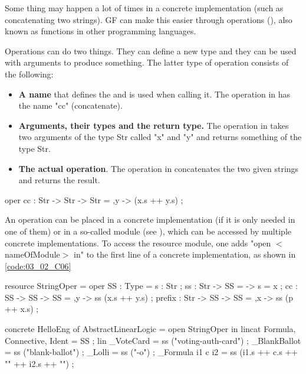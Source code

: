 Some thing may happen a lot of times in a concrete implementation (such as concatenating two strings). GF can make this easier through operations (), also known as functions in other programming languages. 

Operations can do two things. They can define a new type and they can be used with arguments to produce something. The latter type of operation consists of the following:
\begin{itemize}
\item \textbf{A name} that defines the  and is used when calling it. The operation in  has the name "cc" (concatenate).

\item \textbf{Arguments, their types and the return type.} The operation in  takes two arguments of the type Str called "x" and "y" and returns something of the type Str.

\item \textbf{The actual operation}. The operation in  concatenates the two given strings and returns the result.
\end{itemize}

\begin{lstgf}
oper 
    cc : Str -> Str -> Str = \x,y -> (x.s ++ y.s) ;
\end{lstgf}

An operation can be placed in a concrete implementation (if it is only needed in one of them) or in a so-called  module (see ), which can be accessed by multiple concrete implementations. To access the resource module, one adds "open $<$nameOfModule$>$ in" to the first line of a concrete implementation, as shown in \ref{code:03_02_C06}

\begin{lstgf}
resource StringOper = {
    oper
        SS : Type = {s : Str} ;
        ss : Str -> SS = \x -> {s = x} ;
        cc : SS -> SS -> SS = \x,y -> ss (x.s ++ y.s) ;
        prefix : Str -> SS -> SS = \p,x -> ss (p ++ x.s) ;
}
\end{lstgf}

\begin{lstgf}
concrete HelloEng of AbstractLinearLogic = open StringOper in {
    lincat 
        Formula, Connective, Ident = SS ;
    lin 
        _VoteCard = ss ("voting-auth-card") ;
        _BlankBallot = ss ("blank-ballot") ;
        _Lolli = ss ("-o") ;
        _Formula i1 c i2 = ss (i1.s ++ c.s ++ "{" ++ i2.s ++ "}") ;
}
\end{lstgf}

